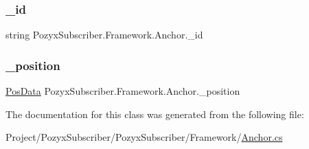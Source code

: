 \subsubsection{\texorpdfstring{\+\_\+id}{\_id}}
{\footnotesize\ttfamily string Pozyx\+Subscriber.\+Framework.\+Anchor.\+\_\+id\hspace{0.3cm}{\ttfamily [private]}}

\mbox{\label{class_pozyx_subscriber_1_1_framework_1_1_anchor_ac316ecc8136e9a3081a847c41854e67a}} 
\subsubsection{\texorpdfstring{\+\_\+position}{\_position}}
{\footnotesize\ttfamily \hyperlink{struct_pozyx_subscriber_1_1_framework_1_1_pos_data}{Pos\+Data} Pozyx\+Subscriber.\+Framework.\+Anchor.\+\_\+position\hspace{0.3cm}{\ttfamily [private]}}



The documentation for this class was generated from the following file\+:\begin{DoxyCompactItemize}
\item 
Project/\+Pozyx\+Subscriber/\+Pozyx\+Subscriber/\+Framework/\hyperlink{_anchor_8cs}{Anchor.\+cs}\end{DoxyCompactItemize}
